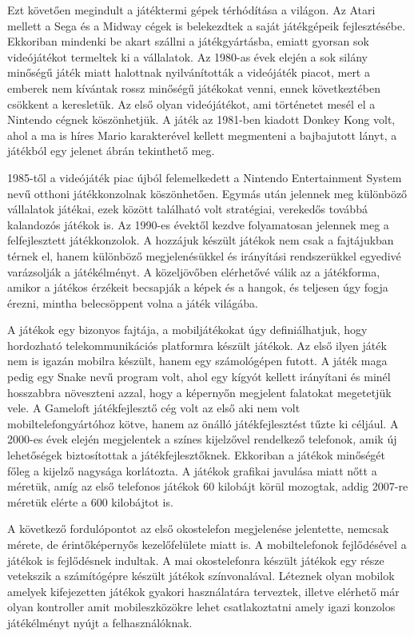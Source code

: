 
Ezt követően megindult a játéktermi gépek térhódítása a világon. 
Az Atari mellett a Sega és a Midway cégek is belekezdtek a saját játékgépeik fejlesztésébe. 
Ekkoriban mindenki be akart szállni a játékgyártásba, emiatt gyorsan sok videójátékot termeltek ki a vállalatok. 
Az 1980-as évek elején a sok silány minőségű játék miatt halottnak nyilvánították a videójáték piacot, mert a emberek nem kívántak rossz minőségű játékokat venni, ennek következtében csökkent a keresletük. 
Az első olyan videójátékot, ami történetet mesél el a Nintendo cégnek köszönhetjük. 
A játék az 1981-ben kiadott Donkey Kong volt, ahol a ma is híres Mario karakterével kellett megmenteni a bajbajutott lányt, a játékból egy jelenet  ábrán tekinthető meg. 

1985-től a videójáték piac újból felemelkedett a Nintendo Entertainment System nevű otthoni játékkonzolnak köszönhetően. 
Egymás után jelennek meg különböző vállalatok játékai, ezek között található volt stratégiai, verekedős továbbá kalandozós játékok is. 
Az 1990-es évektől kezdve folyamatosan jelennek meg a felfejlesztett játékkonzolok. 
A hozzájuk készült játékok nem csak a fajtájukban térnek el, hanem különböző megjelenésükkel és irányítási rendszerükkel egyedivé varázsolják a játékélményt. 
A közeljövőben elérhetővé válik az a játékforma, amikor a játékos érzékeit becsapják a képek és a hangok, és teljesen úgy fogja érezni, mintha belecsöppent volna a játék világába. 

A játékok egy bizonyos fajtája, a mobiljátékokat úgy definiálhatjuk, hogy hordozható telekommunikációs platformra készült játékok. 
Az első ilyen játék nem is igazán mobilra készült, hanem egy számológépen futott. 
A játék maga pedig egy Snake nevű program volt, ahol egy kígyót kellett irányítani és minél hosszabbra növeszteni azzal, hogy a képernyőn megjelent falatokat megetetjük vele. 
A Gameloft játékfejlesztő cég volt az első aki nem volt mobiltelefongyártóhoz kötve, hanem az önálló játékfejlesztést tűzte ki céljául. 
A 2000-es évek elején megjelentek a színes kijelzővel rendelkező telefonok, amik új lehetőségek biztosítottak a játékfejlesztőknek. 
Ekkoriban a játékok minőségét főleg a kijelző nagysága korlátozta. 
A játékok grafikai javulása miatt nőtt a méretük, amíg az első telefonos játékok 60 kilobájt körül mozogtak, addig 2007-re méretük elérte a 600 kilobájtot is. 

A következő fordulópontot az első okostelefon megjelenése jelentette, nemcsak mérete, de érintőképernyős kezelőfelülete miatt is. 
A mobiltelefonok fejlődésével a játékok is fejlődésnek indultak. 
A mai okostelefonra készült játékok egy része vetekszik a számítógépre készült játékok színvonalával. 
Léteznek olyan mobilok amelyek kifejezetten játékok gyakori használatára terveztek, illetve elérhető már olyan kontroller amit mobileszközökre lehet csatlakoztatni amely igazi konzolos játékélményt nyújt a felhasználóknak. 


